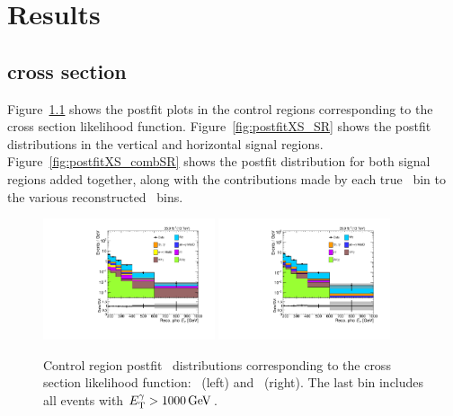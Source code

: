 \chapter{Results} \label{chap:results}
\section{\texorpdfstring{\zinvg}{Z(νν)γ} cross section} \label{sec:results_znng_xsec}
Figure~\ref{fig:postfitXS_CR} shows the postfit plots in the control regions corresponding to the cross section likelihood function.
Figure~\ref{fig:postfitXS_SR} shows the postfit distributions in the vertical and horizontal signal regions.
Figure~\ref{fig:postfitXS_combSR} shows the postfit distribution for both signal regions added together, along with the contributions
made by each true \pTgamma\ bin to the various reconstructed \ETgamma\ bins.

\begin{figure}[htbp]
  \begin{center}
    \includegraphics[width=0.45\textwidth]{figures/xsec_results/Postfit/postfit_weng_phoPt.pdf}
    \includegraphics[width=0.45\textwidth]{figures/xsec_results/Postfit/postfit_wmng_phoPt.pdf}
    \caption{
      Control region postfit \ETgamma\ distributions corresponding to the cross section likelihood function:
      \Pe\Pgamma\ (left) and \Pmu\Pgamma\ (right). The last bin includes all events with $\ETgamma > 1000\unit{GeV}$.
    }
    \label{fig:postfitXS_CR}
  \end{center}
\end{figure}

